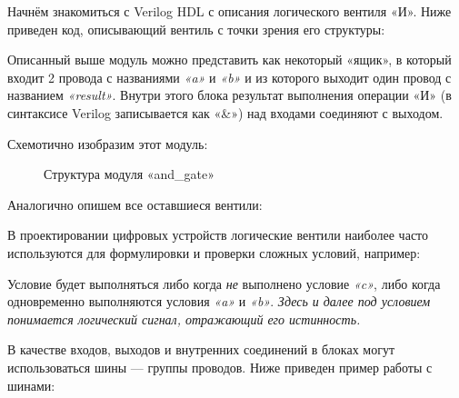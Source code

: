 \documentclass[a5paper, DIV=14, headings=openany, twoside=true,fontsize=10pt, titlepage]{scrreprt}
\newcommand{\quotes}[1]{«#1»}
\newcommand{\eng}[1]{\foreignlanguage{english}{#1}}
\newcommand{\qeng}[1]{\quotes{\foreignlanguage{english}{#1}}}
\begin{document}
\par{Начнём знакомиться с \eng{Verilog HDL} с описания логического вентиля \quotes{И}. Ниже приведен код, описывающий вентиль с точки зрения его структуры:}



\par{Описанный выше модуль можно представить как некоторый \quotes{ящик}, в который входит 2 провода с названиями \emph{\qeng{a}} и \emph{\qeng{b}} и из которого выходит один провод с названием \emph{\qeng{result}}. Внутри этого блока результат выполнения операции \quotes{И} (в синтаксисе Verilog записывается как \quotes{\&}) над входами соединяют с выходом.}
\par{Схемотично изобразим этот модуль:}

\begin{figure}[H]
\centering
\def\svgwidth{\columnwidth}

\caption{Структура модуля \qeng{and\_gate}}
\end{figure}

\par{Аналогично опишем все оставшиеся вентили:}





\par{В проектировании цифровых устройств логические вентили наиболее часто используются для формулировки и проверки сложных условий, например:}



\par{Условие будет выполняться либо когда \emph{не} выполнено условие \emph{\qeng{c}}, либо когда одновременно выполняются условия \emph{\qeng{a}} и \emph{\qeng{b}}. \emph{Здесь и далее под условием понимается логический сигнал, отражающий его истинность.}}
\par{В качестве входов, выходов и внутренних соединений в блоках могут использоваться шины — группы проводов. Ниже приведен пример работы с шинами:}


\end{document}
